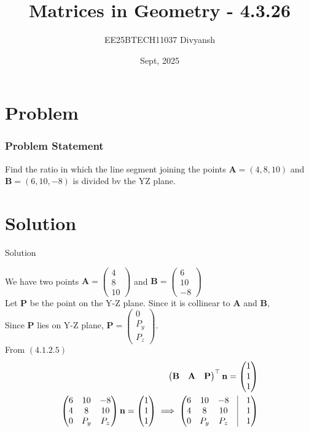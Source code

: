\documentclass{beamer}
\title{Matrices in Geometry - 4.3.26}
\author{EE25BTECH11037  Divyansh}
\date{Sept, 2025}
\let\vec\mathbf
\providecommand{\brak}[1]{\ensuremath{\left(#1\right)}}
\theoremstyle{remark}
\newcommand{\myvec}[1]{\ensuremath{\begin{pmatrix}#1\end{pmatrix}}}
\begin{document}
\maketitle


\section{Problem}
\begin{frame}
\frametitle{Problem Statement}
Find the ratio in which the line segment joining the points $\vec{A}=\brak{4,8,10}$ and $\vec{B}=\brak{6, 10, -8}$ is divided bv the YZ plane.
\end{frame}

\section{Solution}
\begin{frame}{Solution}
   
We have two points $\vec{A}=\myvec{4\\ 8 \\  10}$ and $\vec{B}=\myvec{6\\  10\\ -8}$\\
Let $\vec{P}$ be the point on the Y-Z plane. Since it is collinear to $\vec{A}$ and $\vec{B}$, \\
Since $\vec{P}$ lies on Y-Z plane, $\vec{P}=\myvec{0 \\ P_y \\ P_z }$.\\ 
From $\brak{4.1.2.5}$
\begin{align}
    \myvec{\vec{B} & \vec{A} & \vec{P}}^{\top} \vec{n}=\myvec{1 \\ 1 \\1}\\
    \myvec{6 &10&-8 \\ 4 & 8& 10 \\ 0& P_y & P_z}\vec{n}=\myvec{1 \\ 1 \\1} \implies \myvec{6&10&-8&\vrule&1\\4&8&10&\vrule&1\\0&P_y&P_z&\vrule&1}
\end{align}
\end{frame}
\end{document}
